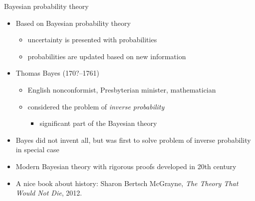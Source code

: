 \documentclass[english,t]{beamer}
\begin{document}
\begin{frame}{Bayesian probability theory}

  \begin{itemize}
  \item Based on Bayesian probability theory
    \begin{itemize}
    \item uncertainty is presented with probabilities
    \item probabilities are updated based on new information
    \end{itemize}
    \pause
    \item Thomas Bayes (170?--1761)
    \begin{itemize}
    \item English nonconformist, Presbyterian minister,
      mathematician
    \item considered the problem of {\it inverse probability}
      \begin{itemize}
        \item significant part of the Bayesian theory
      \end{itemize}
  \end{itemize}
  \pause
  \item Bayes did not invent all, but was first to solve problem of
    inverse probability in special case
  \item Modern Bayesian theory with rigorous proofs developed in
    20th century
    \pause
  \item A nice book about history: Sharon Bertsch McGrayne,
    \textit{The Theory That Would Not Die}, 2012.
\end{itemize}
\end{frame}
\end{document}
